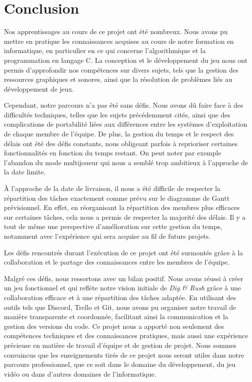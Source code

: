 \documentclass[a4paper,12pt]{article}
\begin{document}
\section{Conclusion}

Nos apprentissages au cours de ce projet ont été nombreux. Nous avons pu mettre en pratique les connaissances acquises au cours de notre formation en informatique, en particulier en ce qui concerne l’algorithmique et la programmation en langage C. 
La conception et le développement du jeu nous ont permis d’approfondir nos compétences sur divers sujets, tels que la gestion des ressources graphiques et sonores, ainsi que la résolution de problèmes liés au développement de jeux.

Cependant, notre parcours n’a pas été sans défis. Nous avons dû faire face à des diﬀicultés techniques, telles que les sujets précédemment cités, ainsi que des complications de portabilité liées aux différences entre les systèmes d’exploitation de chaque membre de l’équipe. De plus, la gestion du temps et le respect des délais ont été des défis constants, nous obligeant parfois à reprioriser certaines fonctionnalités en fonction du temps restant. 
On peut noter par exemple l’abandon du mode multijoueur qui nous a semblé trop ambitieux à l’approche de la date limite. 

À l’approche de la date de livraison, il nous a été diﬀicile de respecter la répartition des tâches exactement comme prévu sur le diagramme de Gantt prévisionnel.
En effet, en réorganisant la répartition des membres plus eﬀicaces sur certaines tâches, cela nous a permis de respecter la majorité des délais. Il y a tout de même une perspective d’amélioration sur cette gestion du temps, notamment avec l’expérience qui sera acquise au fil de futurs projets.

Les défis rencontrés durant l’exécution de ce projet ont été surmontés grâce à la collaboration et le partage des connaissances entre les membres de l’équipe.

Malgré ces défis, nous ressortons avec un bilan positif. 
Nous avons réussi à créer un jeu fonctionnel et qui reflète notre vision initiale de \textit{Dig \& Rush} grâce à une collaboration efficace et à une répartition des tâches adaptée. 
En utilisant des outils tels que Discord, Trello et Git, nous avons pu organiser notre travail de manière transparente et coordonnée, facilitant ainsi la communication et la gestion des versions du code.
Ce projet nous a apporté non seulement des compétences techniques et des connaissances pratiques, mais aussi une expérience précieuse en matière de travail d’équipe et de gestion de projet. 
Nous sommes convaincus que les enseignements tirés de ce projet nous seront utiles dans notre parcours professionnel, que ce soit dans le domaine du développement, du jeu vidéo ou dans d’autres domaines de l’informatique.
\end{document}
